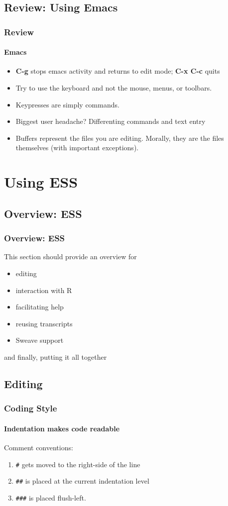 \documentclass{beamer}
\begin{document}
\subsection{Review: Using Emacs}

\begin{frame}
  \frametitle{Review}
  \framesubtitle{Emacs}
  \begin{itemize}
  \item \textbf{C-g} stops emacs activity and returns to edit mode; \textbf{C-x C-c} quits
  \item Try to use the keyboard and not the mouse, menus, or toolbars.
  \item Keypresses are simply commands.
  \item Biggest user headache?  Differenting commands and text entry
  \item Buffers represent the files you are editing.  Morally, they
    are the files themselves (with important exceptions).
  \end{itemize}
\end{frame}


\section{Using ESS}

\subsection{Overview: ESS}

\begin{frame}
  \frametitle{Overview: ESS}
  This section should provide an overview for 
  \begin{itemize}
  \item editing
  \item interaction with R
  \item facilitating help
  \item reusing transcripts
  \item Sweave support
  \end{itemize}
  and finally, \alert{putting it all together}
\end{frame}

\subsection{Editing}

\begin{frame}[fragile]
  \frametitle{Coding Style}
  \framesubtitle{Indentation makes code readable}

  Comment conventions:
  \begin{enumerate}
  \item \verb+#+ gets moved to the right-side of the line
  \item \verb+##+ is placed at the current indentation level
  \item \verb+###+ is placed flush-left.
  \end{enumerate}
\end{frame}
\end{document}
